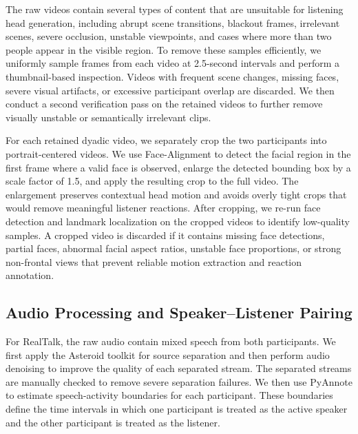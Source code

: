 The raw videos contain several types of content that are unsuitable for listening head generation, including abrupt scene transitions, blackout frames, irrelevant scenes, severe occlusion, unstable viewpoints, and cases where more than two people appear in the visible region. To remove these samples efficiently, we uniformly sample frames from each video at 2.5-second intervals and perform a thumbnail-based inspection. Videos with frequent scene changes, missing faces, severe visual artifacts, or excessive participant overlap are discarded. We then conduct a second verification pass on the retained videos to further remove visually unstable or semantically irrelevant clips.

For each retained dyadic video, we separately crop the two participants into portrait-centered videos. We use Face-Alignment \cite{bulat2017far} to detect the facial region in the first frame where a valid face is observed, enlarge the detected bounding box by a scale factor of 1.5, and apply the resulting crop to the full video. The enlargement preserves contextual head motion and avoids overly tight crops that would remove meaningful listener reactions. After cropping, we re-run face detection and landmark localization on the cropped videos to identify low-quality samples. A cropped video is discarded if it contains missing face detections, partial faces, abnormal facial aspect ratios, unstable face proportions, or strong non-frontal views that prevent reliable motion extraction and reaction annotation.






\subsection{Audio Processing and Speaker--Listener Pairing}  \label{app:audio_pairing}

For RealTalk, the raw audio contain mixed speech from both participants. We first apply the Asteroid toolkit \cite{pariente2020asteroid} for source separation and then perform audio denoising to improve the quality of each separated stream. The separated streams are manually checked to remove severe separation failures. We then use PyAnnote \cite{Plaquet23pyannote1,Bredin23pyannote2} to estimate speech-activity boundaries for each participant. These boundaries define the time intervals in which one participant is treated as the active speaker and the other participant is treated as the listener.

